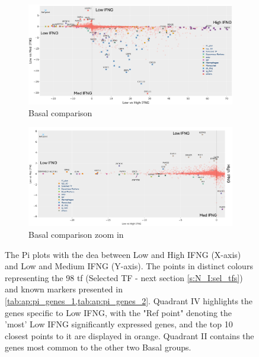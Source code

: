 \begin{figure}[H]
    \centering
    \begin{subfigure}[!t]{1.0\textwidth}
        \includegraphics[width=\textwidth,keepaspectratio]{Sections/ClusteringAnalysis/Resources/discussion/basal_comp_pi.png}    
        \caption{Basal comparison}
        \label{fig:cs:basal_comp}
    \end{subfigure}
    \centering
    \begin{subfigure}[!t]{1.0\textwidth}
        \includegraphics[width=\textwidth, keepaspectratio]{Sections/ClusteringAnalysis/Resources/discussion/basal_comp_pi_zoom.png}
        \caption{Basal comparison zoom in}
        \label{fig:cs:basal_comp_zoom}
    \end{subfigure} 
    \centering
    \caption[Pi-plot - comparisons between Basal groups]{The Pi plots with the \acrshort{dea} between Low and High IFNG (X-axis) and Low and Medium IFNG (Y-axis). The points in distinct colours representing the 98 \acrlong{tf} (Selected TF - next section \cref{s:N_I:sel_tfs}) and known markers presented in \cref{tab:ap:pi_genes_1,tab:ap:pi_genes_2}. Quadrant IV highlights the genes specific to Low IFNG, with the "Ref point" denoting the 'most' Low IFNG significantly expressed genes, and the top 10 closest points to it are displayed in orange. Quadrant II contains the genes most common to the other two Basal groups.}
    \label{fig:cs:pi_basal}
\end{figure}

